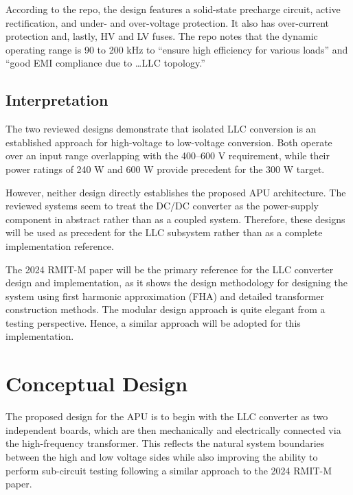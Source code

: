 \documentclass[12pt,a4paper]{article}
\begin{document}
According to the repo, the design features a solid-state precharge circuit, active rectification, and under- and over-voltage protection. It also
has over-current protection and, lastly, HV and LV fuses. The repo notes that the dynamic operating range is 90 to 200 kHz to ``ensure high efficiency for various loads''
and ``good EMI compliance due to \ldots LLC topology.''

\subsection{Interpretation}

The two reviewed designs demonstrate that isolated LLC conversion is an established approach for high-voltage to low-voltage conversion. Both operate over an input 
range overlapping with the 400--600 V requirement, while their power ratings of 240 W and 600 W provide precedent for the 300 W target.

\vspace{0.5cm}

However, neither design directly establishes the proposed APU architecture. The reviewed systems seem to treat the DC/DC converter as the power-supply 
component in abstract rather than as a coupled system. Therefore, these designs will be used as precedent for the LLC subsystem rather than as a complete implementation
reference.

\vspace{0.5cm}

The 2024 RMIT-M paper will be the primary reference for the LLC converter design and implementation, as it shows the design methodology for designing the system using
first harmonic approximation (FHA) and detailed transformer construction methods. The modular design approach is quite elegant from a testing perspective. Hence, a similar approach
will be adopted for this implementation.

\section{Conceptual Design}

The proposed design for the APU is to begin with the LLC converter as two independent boards, which are then mechanically and electrically connected
via the high-frequency transformer. This reflects the natural system boundaries between the high and low voltage sides while also improving the ability to perform
sub-circuit testing following a similar approach to the 2024 RMIT-M paper.
\end{document}
